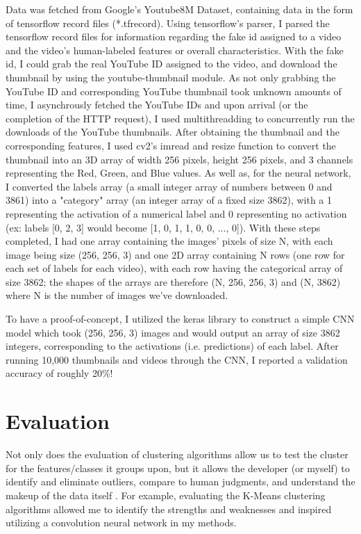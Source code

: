 \documentclass[10pt,twocolumn]{article}
\begin{document}
Data was fetched from Google's Youtube8M Dataset, containing data in the form of tensorflow record files (*.tfrecord). Using tensorflow's parser, I parsed the tensorflow record files for information regarding the fake id assigned to a video and the video's human-labeled features or overall characteristics. With the fake id, I could grab the real YouTube ID assigned to the video, and download the thumbnail by using the youtube-thumbnail module. As not only grabbing the YouTube ID and corresponding YouTube thumbnail took unknown amounts of time, I asynchrously fetched the YouTube IDs and upon arrival (or the completion of the HTTP request), I used multithreadding to concurrently run the downloads of the YouTube thumbnails. After obtaining the thumbnail and the corresponding features, I used cv2's imread and resize function to convert the thumbnail into an 3D array of width 256 pixels, height 256 pixels, and 3 channels representing the Red, Green, and Blue values. As well as, for the neural network, I converted the labels array (a small integer array of numbers between 0 and 3861) into a "category" array (an integer array of a fixed size 3862), with a 1 representing the activation of a numerical label and 0 representing no activation (ex: labels [0, 2, 3] would become [1, 0, 1, 1, 0, 0, ..., 0]). With these steps completed, I had one array containing the images' pixels of size N, with each image being size (256, 256, 3) and one 2D array containing N rows (one row for each set of labels for each video), with each row having the categorical array of size 3862; the shapes of the arrays are therefore (N, 256, 256, 3) and (N, 3862) where N is the number of images we've downloaded.

To have a proof-of-concept, I utilized the keras library to construct a simple CNN model which took (256, 256, 3) images and would output an array of size 3862 integers, corresponding to the activations (i.e. predictions) of each label. After running 10,000 thumbnails and videos through the CNN, I reported a validation accuracy of roughly 20\%!


\section{Evaluation}

Not only does the evaluation of clustering algorithms allow us to test the cluster for the features/classes it groups upon, but it allows the developer (or myself) to identify and eliminate outliers, compare to human judgments, and understand the makeup of the data itself \cite{Lavrenko2014}. For example, evaluating the K-Means clustering algorithms allowed me to identify the strengths and weaknesses and inspired utilizing a convolution neural network in my methods.
\end{document}
